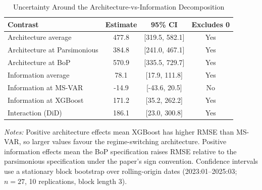 \begin{table}[htbp]
\centering
\footnotesize
\caption{Uncertainty Around the Architecture-vs-Information Decomposition}
\label{tab:disentangling_uncertainty}
\begin{tabular}{lccc}
\toprule
Contrast & Estimate & 95\% CI & Excludes 0 \\
\midrule
Architecture average & 477.8 & [319.5, 582.1] & Yes \\
Architecture at Parsimonious & 384.8 & [241.0, 467.1] & Yes \\
Architecture at BoP & 570.9 & [335.5, 729.7] & Yes \\
Information average & 78.1 & [17.9, 111.8] & Yes \\
Information at MS-VAR & -14.9 & [-43.6, 20.5] & No \\
Information at XGBoost & 171.2 & [35.2, 262.2] & Yes \\
Interaction (DiD) & 186.1 & [23.0, 300.8] & Yes \\
\bottomrule
\end{tabular}
\begin{tablenotes}
\footnotesize
\item \textit{Notes:} Positive architecture effects mean XGBoost has higher RMSE than MS-VAR, so larger values favour the regime-switching architecture. Positive information effects mean the BoP specification raises RMSE relative to the parsimonious specification under the paper's sign convention. Confidence intervals use a stationary block bootstrap over rolling-origin dates (2023:01--2025:03; $n=27$, 10 replications, block length 3).
\end{tablenotes}
\end{table}
